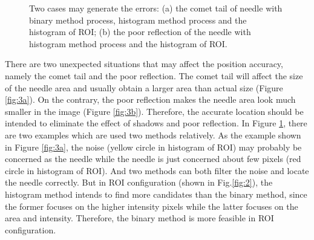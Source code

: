 \documentclass[journal,article,submit,moreauthors,pdftex]{Definitions/mdpi}
\begin{document}
\begin{figure}[H]
\centering
{}
\captionsetup{width=16 cm,justification=centering}
\caption{Two cases may generate the errors: (a) the comet tail of needle with binary method process, histogram method process and the histogram of ROI; (b) the poor reflection of the needle with histogram method process and the histogram of ROI.}
\label{fig:3}
\end{figure}

There are two unexpected situations that may affect the position accuracy, namely the comet tail and the poor reflection.
The comet tail will affect the size of the needle area and usually obtain a larger area than actual size (Figure \ref{fig:3a}).
On the contrary, the poor reflection makes the needle area look much smaller in the image (Figure \ref{fig:3b}).
Therefore, the accurate location should be intended to eliminate the effect of shadows and poor reflection.
In Figure \ref{fig:3}, there are two examples which are used two methods relatively.
As the example shown in Figure \ref{fig:3a}, the noise (yellow circle in histogram of ROI) may probably be concerned as the needle while the needle is just concerned about few pixels (red circle in histogram of ROI).
And two methods can both filter the noise and locate the needle correctly.
But in ROI configuration (shown in Fig.\ref{fig:2}), the histogram method intends to find more candidates than the binary method, since the former focuses on the higher intensity pixels while the latter focuses on the area and intensity.
Therefore, the binary method is more feasible in ROI configuration.
\end{document}
